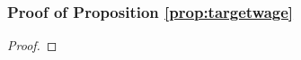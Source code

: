 \subsubsection*{Proof of Proposition \ref{prop:targetwage}} \label{proof:targetwage}
  \begin{proof}


  \end{proof}

